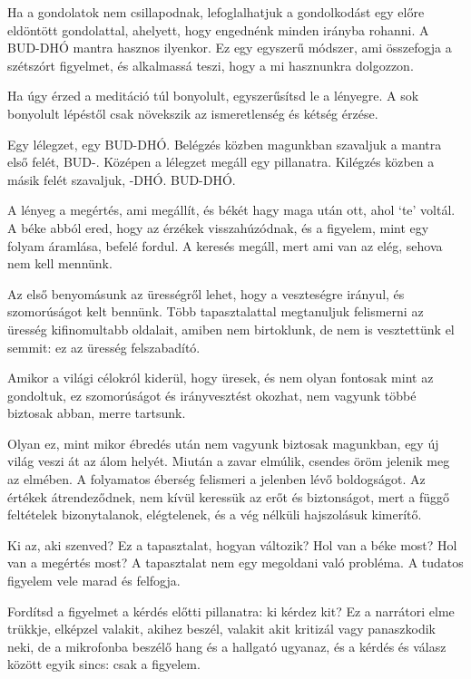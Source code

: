 Ha a gondolatok nem csillapodnak, lefoglalhatjuk a gondolkodást egy
előre eldöntött gondolattal, ahelyett, hogy engednénk minden irányba
rohanni. A BUD-DHÓ mantra hasznos ilyenkor. Ez egy egyszerű módszer, ami
összefogja a szétszórt figyelmet, és alkalmassá teszi, hogy a mi
hasznunkra dolgozzon.

Ha úgy érzed a meditáció túl bonyolult, egyszerűsítsd le a lényegre. A
sok bonyolult lépéstől csak növekszik az ismeretlenség és kétség érzése.

Egy lélegzet, egy BUD-DHÓ. Belégzés közben magunkban szavaljuk a mantra
első felét, BUD-. Középen a lélegzet megáll egy pillanatra. Kilégzés
közben a másik felét szavaljuk, -DHÓ. BUD-DHÓ.

A lényeg a megértés, ami megállít, és békét hagy maga után ott, ahol
`te' voltál. A béke abból ered, hogy az érzékek visszahúzódnak, és a
figyelem, mint egy folyam áramlása, befelé fordul. A keresés megáll,
mert ami van az elég, sehova nem kell mennünk.


\enlargethispage*{\baselineskip}

Az első benyomásunk az ürességről lehet, hogy a veszteségre irányul, és
szomorúságot kelt bennünk. Több tapasztalattal megtanuljuk felismerni az
üresség kifinomultabb oldalait, amiben nem birtoklunk, de nem is
vesztettünk el semmit: ez az üresség felszabadító.

Amikor a világi célokról kiderül, hogy üresek, és nem olyan fontosak
mint az gondoltuk, ez szomorúságot és irányvesztést okozhat, nem vagyunk
többé biztosak abban, merre tartsunk.

Olyan ez, mint mikor ébredés után nem vagyunk biztosak magunkban, egy új
világ veszi át az álom helyét. Miután a zavar elmúlik, csendes öröm
jelenik meg az elmében. A folyamatos éberség felismeri a jelenben lévő
boldogságot. Az értékek átrendeződnek, nem kívül keressük az erőt és
biztonságot, mert a függő feltételek bizonytalanok, elégtelenek, és a
vég nélküli hajszolásuk kimerítő.

Ki az, aki szenved? Ez a tapasztalat, hogyan változik? Hol van a béke
most? Hol van a megértés most? A tapasztalat nem egy megoldani való
probléma. A tudatos figyelem vele marad és felfogja.

Fordítsd a figyelmet a kérdés előtti pillanatra: ki kérdez kit? Ez a
narrátori elme trükkje, elképzel valakit, akihez beszél, valakit akit
kritizál vagy panaszkodik neki, de a mikrofonba beszélő hang és a
hallgató ugyanaz, és a kérdés és válasz között egyik sincs: csak a
figyelem.

